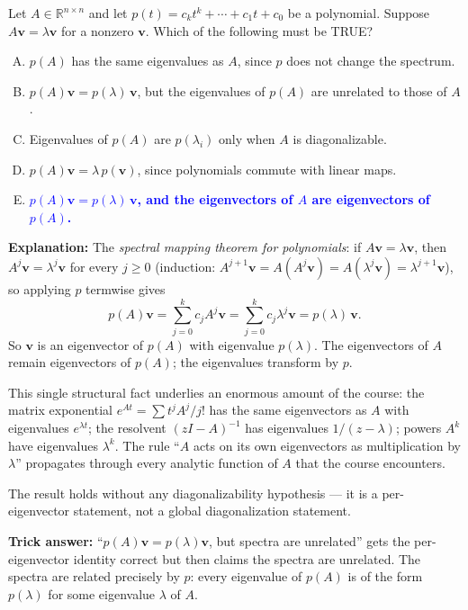 \documentclass[12pt]{amsart}
\begin{document}
Let $A \in \mathbb{R}^{n \times n}$ and let $p(t) = c_k t^k + \cdots + c_1 t + c_0$
be a polynomial. Suppose $A\mathbf{v} = \lambda \mathbf{v}$ for a nonzero
$\mathbf{v}$. Which of the following must be TRUE?

\begin{enumerate}[(A)]
\item $p(A)$ has the same eigenvalues as $A$, since $p$ does not change the spectrum.
\item $p(A)\mathbf{v} = p(\lambda)\,\mathbf{v}$, but the eigenvalues of $p(A)$ are unrelated to those of $A$.
\item Eigenvalues of $p(A)$ are $p(\lambda_i)$ only when $A$ is diagonalizable.
\item $p(A)\mathbf{v} = \lambda\, p(\mathbf{v})$, since polynomials commute with linear maps.
\item \textcolor{blue}{\textbf{$p(A)\mathbf{v} = p(\lambda)\,\mathbf{v}$, and the eigenvectors of $A$ are eigenvectors of $p(A)$.}}
\end{enumerate}

\textbf{Explanation:}
The \emph{spectral mapping theorem for polynomials}: if $A\mathbf{v} = \lambda \mathbf{v}$,
then $A^j \mathbf{v} = \lambda^j \mathbf{v}$ for every $j \geq 0$ (induction:
$A^{j+1}\mathbf{v} = A(A^j \mathbf{v}) = A(\lambda^j \mathbf{v}) = \lambda^{j+1}\mathbf{v}$),
so applying $p$ termwise gives
$$p(A)\mathbf{v} = \sum_{j=0}^{k} c_j A^j \mathbf{v} = \sum_{j=0}^{k} c_j \lambda^j \mathbf{v} = p(\lambda)\,\mathbf{v}.$$
So $\mathbf{v}$ is an eigenvector of $p(A)$ with eigenvalue $p(\lambda)$.
The eigenvectors of $A$ remain eigenvectors of $p(A)$; the eigenvalues
transform by $p$.

This single structural fact underlies an enormous amount of the course: the
matrix exponential $e^{At} = \sum t^j A^j / j!$ has the same eigenvectors as
$A$ with eigenvalues $e^{\lambda t}$; the resolvent $(zI - A)^{-1}$ has
eigenvalues $1/(z - \lambda)$; powers $A^k$ have eigenvalues $\lambda^k$.
The rule ``$A$ acts on its own eigenvectors as multiplication by $\lambda$''
propagates through every analytic function of $A$ that the course encounters.

The result holds without any diagonalizability hypothesis --- it is a
per-eigenvector statement, not a global diagonalization statement.

\textbf{Trick answer:}
``$p(A)\mathbf{v} = p(\lambda)\mathbf{v}$, but spectra are unrelated'' gets
the per-eigenvector identity correct but then claims the spectra are
unrelated. The spectra are related precisely by $p$: every eigenvalue of
$p(A)$ is of the form $p(\lambda)$ for some eigenvalue $\lambda$ of $A$.
\end{document}
